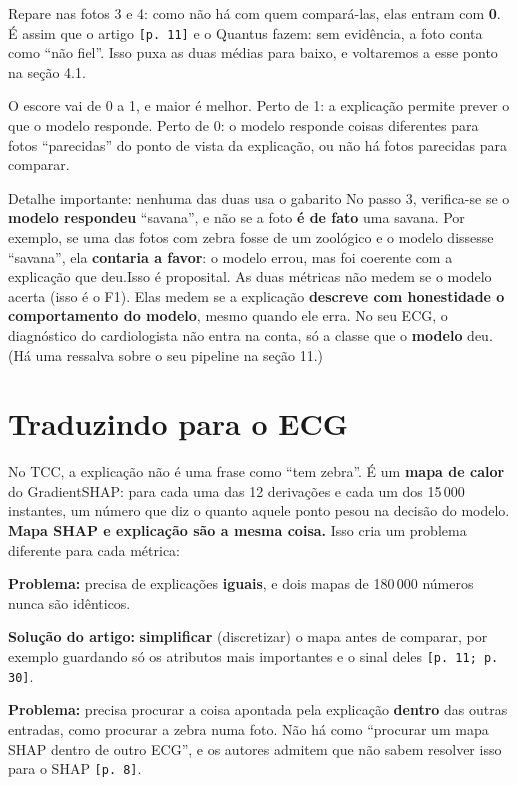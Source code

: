 \documentclass[11pt,a4paper]{article}
\newenvironment{paircol}[2]{\begin{tcolorbox}[width=0.485\linewidth, nobeforeafter, box align=top, boxrule=0.5pt,
  colframe=black!25, colback=white, borderline north={3pt}{0pt}{pair#1}, left=5pt, right=5pt,
  before upper={{\color{pair#1}\small\textbf{\MakeUppercase{#2}}}\par}]}{\end{tcolorbox}}
\begin{document}
Repare nas fotos 3 e 4: como não há com quem compará-las, elas entram com \textbf{0}. É assim que o artigo \texttt{[p. 11]} e o Quantus fazem: sem evidência, a foto conta como “não fiel”. Isso puxa as duas médias para baixo, e voltaremos a esse ponto na seção 4.1.

O escore vai de 0 a 1, e maior é melhor. Perto de 1: a explicação permite prever o que o modelo responde. Perto de 0: o modelo responde coisas diferentes para fotos “parecidas” do ponto de vista da explicação, ou não há fotos parecidas para comparar.

\begin{infobox}[warn]{Detalhe importante: nenhuma das duas usa o gabarito}
No passo 3, verifica-se se o \textbf{modelo respondeu} “savana”, e não se a foto \textbf{é de fato} uma savana. Por exemplo, se uma das fotos com zebra fosse de um zoológico e o modelo dissesse “savana”, ela \textbf{contaria a favor}: o modelo errou, mas foi coerente com a explicação que deu.\newline \newline  Isso é proposital. As duas métricas não medem se o modelo acerta (isso é o F1). Elas medem se a explicação \textbf{descreve com honestidade o comportamento do modelo}, mesmo quando ele erra. No seu ECG, o diagnóstico do cardiologista não entra na conta, só a classe que o \textbf{modelo} deu. (Há uma ressalva sobre o seu pipeline na seção 11.)
\end{infobox}

\section{Traduzindo para o ECG}

No TCC, a explicação não é uma frase como “tem zebra”. É um \textbf{mapa de calor} do GradientSHAP: para cada uma das 12 derivações e cada um dos 15\,000 instantes, um número que diz o quanto aquele ponto pesou na decisão do modelo. \textbf{Mapa SHAP e explicação são a mesma coisa.} Isso cria um problema diferente para cada métrica:

\noindent
\begin{paircol}{c}{Consistency}
\textbf{Problema:} precisa de explicações \textbf{iguais}, e dois mapas de 180\,000 números nunca são idênticos.

\textbf{Solução do artigo:} \textbf{simplificar} (discretizar) o mapa antes de comparar, por exemplo guardando só os atributos mais importantes e o sinal deles \texttt{[p. 11; p. 30]}.
\end{paircol}
\hfill
\begin{paircol}{s}{Sufficiency}
\textbf{Problema:} precisa procurar a coisa apontada pela explicação \textbf{dentro} das outras entradas, como procurar a zebra numa foto. Não há como “procurar um mapa SHAP dentro de outro ECG”, e os autores admitem que não sabem resolver isso para o SHAP \texttt{[p. 8]}.
\end{paircol}
\end{document}
